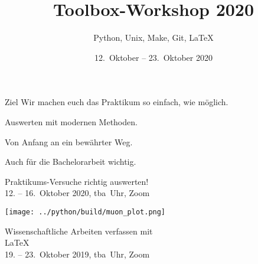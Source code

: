 

\title[Toolbox 2020]{Toolbox-Workshop 2020}
\subtitle{Python, Unix, Make, Git, \LaTeX{}}
\date{12.~Oktober – 23.~Oktober 2020}
\author[Toolbox-Team]{}



\maketitle

\begin{frame}{Ziel}
  \setlength\parskip{3ex}
  \huge
  Wir machen euch das Praktikum so einfach, wie möglich.

  Auswerten mit modernen Methoden.

  Von Anfang an ein bewährter Weg.

  Auch für die Bachelorarbeit wichtig.
\end{frame}

\begin{frame}
  \vspace{2cm}
  \begin{center}
    \huge Praktikums-Versuche richtig auswerten!\\
    12. – 16.~Oktober 2020, tba~Uhr, Zoom 
  \end{center}
\end{frame}

\begin{frame}[plain]
  \texttt{[image: ../python/build/muon\_plot.png]}
\end{frame}

\begin{frame}
  \begin{center}
    \huge Wissenschaftliche Arbeiten verfassen mit \\[0.5\baselineskip]
    \textrm{\fontsize{80}{120}\selectfont\LaTeX{}}\\[0.5\baselineskip]
    19. – 23.~Oktober 2019, tba~Uhr, Zoom\\
  \end{center}
\end{frame}

